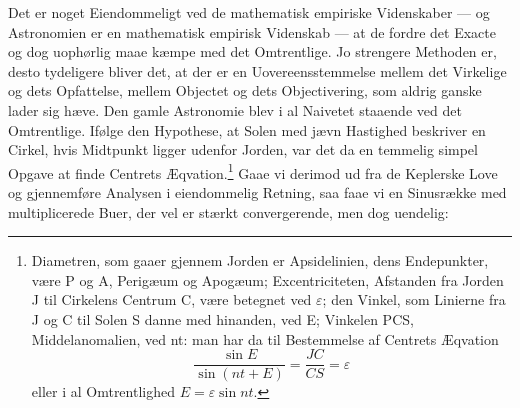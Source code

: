 \documentclass[12pt,a4paper]{book}
\renewcommand{\thefootnote}{*)}
\begin{document}
Det er noget Eiendommeligt ved de mathematisk empiriske
Videnskaber --- og Astronomien er en mathematisk empirisk Videnskab --- at de fordre
det Exacte og dog uophørlig maae kæmpe med det Omtrentlige. Jo
strengere Methoden er, desto tydeligere bliver det, at der er en
Uovereensstemmelse mellem det Virkelige og dets Opfattelse, mellem
Objectet og dets Objectivering, som aldrig ganske lader sig hæve. Den
gamle Astronomie blev i al Naivetet staaende ved det Omtrentlige.
Ifølge den Hypothese, at Solen med jævn Hastighed beskriver en Cirkel,
hvis Midtpunkt ligger udenfor Jorden, var det da en temmelig simpel
Opgave at
finde Centrets Æqvation.\footnote{%
Diametren, som gaaer gjennem Jorden er Apsidelinien, dens Endepunkter,
være P og A, Perigæum og Apogæum; Excentriciteten, Afstanden fra Jorden
J til Cirkelens Centrum C, være betegnet ved $\varepsilon$; den Vinkel,
som Linierne fra J og C til Solen S danne med hinanden, ved E; Vinkelen
PCS, Middelanomalien, ved nt: man har da til Bestemmelse af Centrets
Æqvation
\[
\frac{\sin E}{\sin (nt + E)} = \frac{JC}{CS} = \varepsilon
\]
eller i al Omtrentlighed $E = \varepsilon \sin nt$.}
Gaae vi derimod ud fra de Keplerske Love og gjennemføre Analysen i
eiendommelig Retning, saa faae vi en Sinusrække med multiplicerede
Buer, der vel er stærkt convergerende, men dog uendelig:%
\renewcommand{\thefootnote}{**)}%
\end{document}

